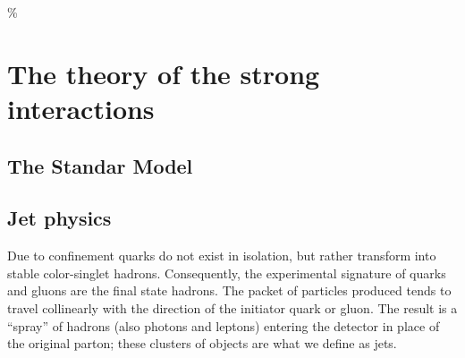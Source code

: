 \%
%
%
\chapter{The theory of the strong interactions}

\section{The Standar Model}\label{sec:qcdintro}




\section{Jet physics}\label{sec:jets}


Due to confinement quarks do not exist in isolation, but rather transform into stable color-singlet hadrons. Consequently, the experimental signature of quarks and gluons are the final state hadrons. The packet of particles produced tends to travel collinearly with the direction of the initiator quark or gluon. The result is a ``spray'' of hadrons (also photons and leptons) entering the detector in place of the original parton; these clusters of objects are what we define as jets.

